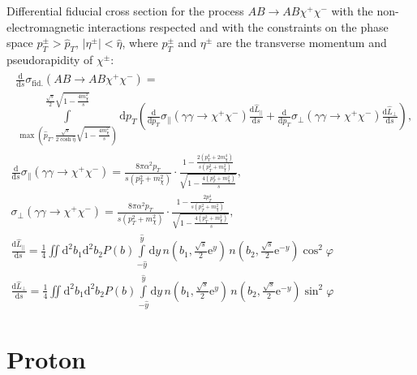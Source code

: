 \documentclass[a4paper,12pt]{article}
\newcommand{\abs}[1]{\lvert #1 \rvert}
\begin{document}
Differential fiducial cross section for the process $AB \to AB \chi^+ \chi^-$
with the non-electromagnetic interactions respected and with the constraints on
the phase space $p_T^\pm > \hat p_T$, $\abs{\eta^\pm} < \hat \eta$, where
$p_T^\pm$ and $\eta^\pm$ are the transverse momentum and pseudorapidity of
$\chi^\pm$:
\begin{gather}
  \begin{multlined}
    \frac{\mathrm{d}}{\mathrm{d} s} \sigma_\text{fid.}(AB \to AB \chi^+ \chi^-)
    = \\ \int\limits_{
        \max \left(
          \hat p_T,
          \frac{\sqrt{s}}{2 \cosh \hat \eta} \sqrt{1 - \frac{4 m_\chi^2}{s}}
        \right)
      }^{\frac{\sqrt{s}}{2} \sqrt{1 - \frac{4 m_\chi^2}{s}}}
        \mathrm{d} p_T
        \left(
            \frac{\mathrm{d}}{\mathrm{d} p_T}
            \sigma_\parallel(\gamma \gamma \to \chi^+ \chi^-)
            \frac{\mathrm{d} \hat L_\parallel}{\mathrm{d} s}
          + \frac{\mathrm{d}}{\mathrm{d} p_T}
            \sigma_\perp(\gamma \gamma \to \chi^+ \chi^-)
            \frac{\mathrm{d} \hat L_\perp}{\mathrm{d} s}
        \right),
  \end{multlined}
  \\
  \frac{\mathrm{d}}{\mathrm{d} s}
  \sigma_\parallel(\gamma \gamma \to \chi^+ \chi^-)
  = \frac{8 \pi \alpha^2 p_T}{s (p_T^2 + m_\chi^2)}
    \cdot \frac{1 - \frac{2 (p_T^4 + 2 m_\chi^4)}{s (p_T^2 + m_\chi^2)}}
               {\sqrt{1 - \frac{4 (p_T^2 + m_\chi^2)}{s}}},
  \\
  \sigma_\perp(\gamma \gamma \to \chi^+ \chi^-)
  = \frac{8 \pi \alpha^2 p_T}{s (p_T^2 + m_\chi^2)}
    \cdot \frac{1 - \frac{2 p_T^4}{s (p_T^2 + m_\chi^2)}}
               {\sqrt{1 - \frac{4 (p_T^2 + m_\chi^2)}{s}}},
  \\
  \frac{\mathrm{d} \hat L_\parallel}{\mathrm{d} s}
  = \frac14
    \iint \mathrm{d}^2 b_1 \mathrm{d}^2 b_2 P(b)
    \int\limits_{-\hat y}^{\hat y} \mathrm{d} y
    \, n \left( b_1, \frac{\sqrt{s}}{2} \mathrm{e}^y    \right)
    \, n \left( b_2, \frac{\sqrt{s}}{2} \mathrm{e}^{-y} \right)
    \cos^2 \varphi
  \\
  \frac{\mathrm{d} \hat L_\perp}{\mathrm{d} s}
  = \frac14
    \iint \mathrm{d}^2 b_1 \mathrm{d}^2 b_2 P(b)
    \int\limits_{-\hat y}^{\hat y} \mathrm{d} y
    \, n \left( b_1, \frac{\sqrt{s}}{2} \mathrm{e}^y    \right)
    \, n \left( b_2, \frac{\sqrt{s}}{2} \mathrm{e}^{-y} \right)
    \sin^2 \varphi
\end{gather}

\section{Proton}
\end{document}

